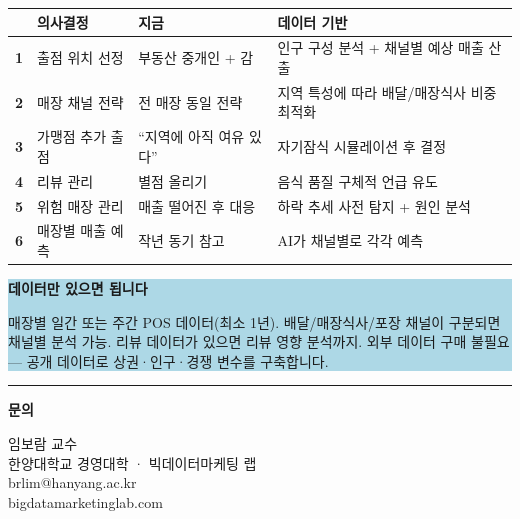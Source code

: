 \documentclass[11pt, a4paper]{article}
\begin{document}
\begin{table}[H]
\centering
\renewcommand{\arraystretch}{1.5}
\begin{tabularx}{\textwidth}{C{0.8cm} L{4cm} X L{3.5cm}}
\toprule
{} & \textbf{의사결정} & \textbf{지금} & \textbf{데이터 기반} \\
\midrule
\textbf{1} & 출점 위치 선정 & 부동산 중개인 + 감 & 인구 구성 분석 + 채널별 예상 매출 산출 \\[4pt]
\textbf{2} & 매장 채널 전략 & 전 매장 동일 전략 & 지역 특성에 따라 배달/매장식사 비중 최적화 \\[4pt]
\textbf{3} & 가맹점 추가 출점 & ``지역에 아직 여유 있다'' & 자기잠식 시뮬레이션 후 결정 \\[4pt]
\textbf{4} & 리뷰 관리 & 별점 올리기 & 음식 품질 구체적 언급 유도 \\[4pt]
\textbf{5} & 위험 매장 관리 & 매출 떨어진 후 대응 & 하락 추세 사전 탐지 + 원인 분석 \\[4pt]
\textbf{6} & 매장별 매출 예측 & 작년 동기 참고 & AI가 채널별로 각각 예측 \\
\bottomrule
\end{tabularx}
\end{table}

\vspace{0.5cm}

\colorbox{lightblue}{%
\begin{minipage}{0.95\textwidth}\vspace{8pt}
\centering
{\large\bfseries\color{darkblue} 데이터만 있으면 됩니다}\\[8pt]
\begin{minipage}{0.85\textwidth}
매장별 일간 또는 주간 POS 데이터(최소 1년). 배달/매장식사/포장 채널이 구분되면 채널별 분석 가능. 리뷰 데이터가 있으면 리뷰 영향 분석까지. 외부 데이터 구매 불필요 — 공개 데이터로 상권·인구·경쟁 변수를 구축합니다.
\end{minipage}
\vspace{8pt}
\end{minipage}%
}

\vspace{1.5cm}

\begin{center}
\textcolor{medblue}{\rule{8cm}{0.8pt}}

\vspace{0.8cm}

{\Large\bfseries\color{darkblue} 문의}

\vspace{0.4cm}

{\large\color{darkgray}
임보람 교수\\[3pt]
한양대학교 경영대학 · 빅데이터마케팅 랩\\[6pt]
brlim@hanyang.ac.kr\\[3pt]
bigdatamarketinglab.com}
\end{center}
\end{document}
